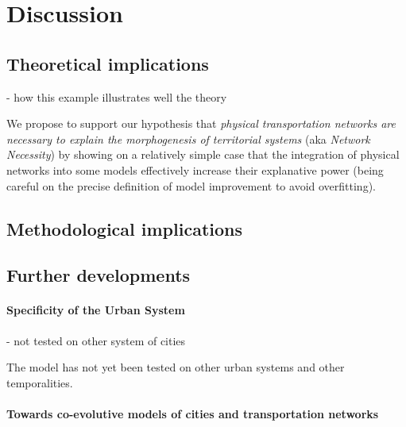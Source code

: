 \documentclass[Royal,sageh,times]{sagej}
\begin{document}
\section*{Discussion}


%



\subsection*{Theoretical implications}

- how this example illustrates well the theory

We propose to support our hypothesis that \textit{physical transportation networks are necessary to explain the morphogenesis of territorial systems} (aka \textit{Network Necessity}) by showing on a relatively simple case that the integration of physical networks into some models effectively increase their explanative power (being careful on the precise definition of model improvement to avoid overfitting).




\subsection*{Methodological implications}




\subsection*{Further developments}


\paragraph{Specificity of the Urban System}

- not tested on other system of cities

The model has not yet been tested on other urban systems and other temporalities.



\paragraph{Towards co-evolutive models of cities and transportation networks}
\end{document}
